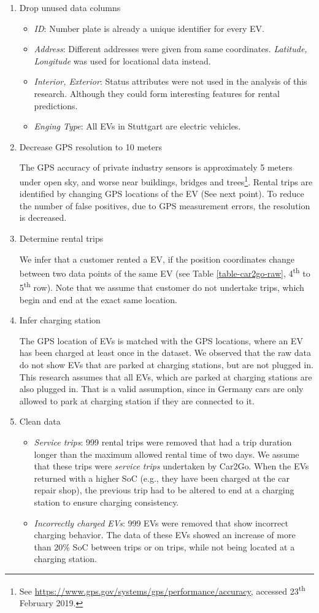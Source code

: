 \documentclass[a4paper, 12pt]{article}
\begin{document}
\begin{enumerate}
\item Drop unused data columns

\begin{itemize}
\item \emph{ID}: Number plate is already a unique identifier for every EV.
\item \emph{Address}: Different addresses were given from same coordinates. \emph{Latitude,
Longitude} was used for locational data instead.
\item \emph{Interior, Exterior}: Status attributes were not used in the analysis of
this research. Although they could form interesting features for rental
predictions.
\item \emph{Enging Type}: All EVs in Stuttgart are electric vehicles.
\end{itemize}
\item Decrease GPS resolution to 10 meters

The GPS accuracy of private industry sensors is approximately 5 meters under
open sky, and worse near buildings, bridges and trees\footnote{See \url{https://www.gps.gov/systems/gps/performance/accuracy}, accessed
23\textsuperscript{th} February 2019.}. Rental trips are
identified by changing GPS locations of the EV (See next point). To reduce
the number of false positives, due to GPS measurement errors, the resolution
is decreased.
\item Determine rental trips

We infer that a customer rented a EV, if the position coordinates change
between two data points of the same EV (see Table \ref{table-car2go-raw}, 4\textsuperscript{th}
to 5\textsuperscript{th} row). Note that we assume that customer do not undertake trips,
which begin and end at the exact same location.
\item Infer charging station

The GPS location of EVs is matched with the GPS locations, where an EV has
been charged at least once in the dataset. We observed that the raw data do
not show EVs that are parked at charging stations, but are not plugged in.
This research assumes that all EVs, which are parked at charging stations are
also plugged in. That is a valid assumption, since in Germany cars are only
allowed to park at charging station if they are connected to it.
\item Clean data
\begin{itemize}
\item \emph{Service trips}: 999 rental trips were removed that had a trip duration
longer than the maximum allowed rental time of two days. We assume that
these trips were \emph{service trips} undertaken by Car2Go. When the EVs
returned with a higher SoC (e.g., they have been charged at the car repair
shop), the previous trip had to be altered to end at a charging station to
ensure charging consistency.
\item \emph{Incorrectly charged EVs}: 999 EVs were removed that show incorrect
charging behavior. The data of these EVs showed an increase of more than
20\% SoC between trips or on trips, while not being located at a charging
station.
\end{itemize}
\end{enumerate}
\end{document}
